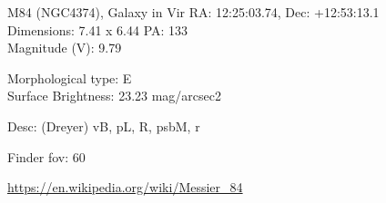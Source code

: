 \begin{block}{M84 (NGC4374), Galaxy in Vir}
    RA: 12:25:03.74, Dec: +12:53:13.1 \\ 
    Dimensions: 7.41 x 6.44 PA: 133 \\ 
    Magnitude (V): 9.79

    Morphological type: E \\ 
    Surface Brightness: 23.23 mag/arcsec2 

    Desc: (Dreyer) vB, pL, R, psbM, r 

    Finder fov: 60 

    \url{https://en.wikipedia.org/wiki/Messier_84} 
\end{block}